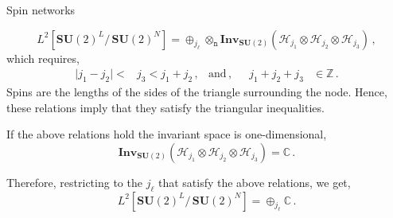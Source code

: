 \documentclass[12pt,titlepage]{article}
\begin{document}
\begin{frame}{Spin networks}
\begin{list}{\,}{\leftmargin=1em \itemindent=0em}
\begin{equation}
            L^2[{\mathbf{SU}(2)}^L/\,{\mathbf{SU}(2)}^N]=\oplus_{j_\ell}\otimes_\mathtt{n}\mathbf{Inv}_{\mathbf{SU}(2)}(\mathcal{H}_{j_1}\otimes\mathcal{H}_{j_2}\otimes\mathcal{H}_{j_3})\,,
        \end{equation}
        which requires,
        \begin{align}
            \lvert j_1-j_2\rvert<&j_3<j_1+j_2\,,&\text{and}\,,& &j_1+j_2+j_3&\in\mathbb{Z}\,. 
        \end{align}
        Spins are the lengths of the sides of the triangle surrounding the node. Hence, these relations imply that they satisfy the triangular inequalities.
        \item<3-> If the above relations hold the invariant space is one-dimensional,
        \begin{equation}
            \mathbf{Inv}_{\mathbf{SU}(2)}(\mathcal{H}_{j_1}\otimes\mathcal{H}_{j_2}\otimes\mathcal{H}_{j_3})=\mathbb{C}\,.
        \end{equation}
        \item<4-> Therefore, restricting to the $j_\ell$ that satisfy the above relations, we get,
        \begin{equation}
            L^2[{\mathbf{SU}(2)}^L/\,{\mathbf{SU}(2)}^N]=\oplus_{j_\ell}\mathbb{C}\,.
        \end{equation}
    \end{list}
\end{frame}
\end{document}
